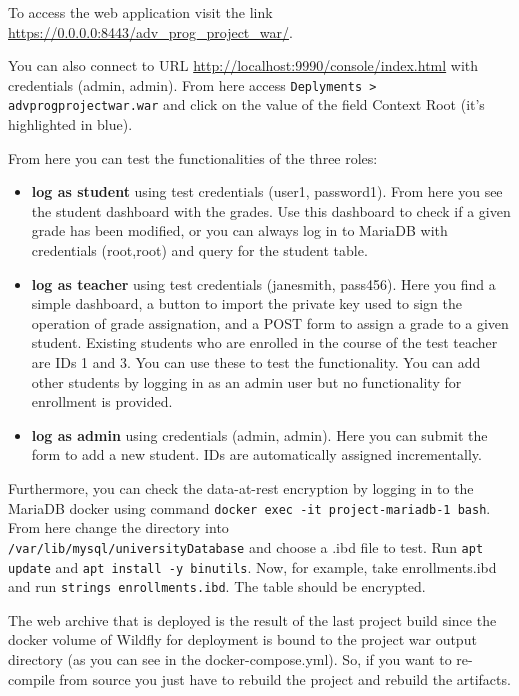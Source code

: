 To access the web application visit the link \url{https://0.0.0.0:8443/adv_prog_project_war/}.

You can also connect to URL \url{http://localhost:9990/console/index.html} with credentials (admin, admin). From here access \texttt{Deplyments > adv\textunderscore prog\textunderscore project\textunderscore war.war} and click on the value of the field Context Root (it's highlighted in blue).

From here you can test the functionalities of the three roles:

\begin{itemize}
    \item \textbf{log as student} using test credentials (user1, password1). From here you see the student dashboard with the grades. Use this dashboard to check if a given grade has been modified, or you can always log in to MariaDB with credentials (root,root) and query for the student table.
    \item \textbf{log as teacher} using test credentials (jane\textunderscore smith, pass456). Here you find a simple dashboard, a button to import the private key used to sign the operation of grade assignation, and a POST form to assign a grade to a given student. Existing students who are enrolled in the course of the test teacher are IDs 1 and 3. You can use these to test the functionality. You can add other students by logging in as an admin user but no functionality for enrollment is provided.
    \item \textbf{log as admin} using credentials (admin, admin). Here you can submit the form to add a new student. IDs are automatically assigned incrementally.
\end{itemize}

Furthermore, you can check the data-at-rest encryption by logging in to the MariaDB docker using command \texttt{docker exec -it project-mariadb-1 bash}. From here change the directory into \\\texttt{/var/lib/mysql/universityDatabase} and choose a .ibd file to test. Run \texttt{apt update} and \texttt{apt install -y binutils}. Now, for example, take enrollments.ibd and run \texttt{strings enrollments.ibd}. The table should be encrypted.

The web archive that is deployed is the result of the last project build since the docker volume of Wildfly for deployment is bound to the project war output directory (as you can see in the docker-compose.yml). So, if you want to re-compile from source you just have to rebuild the project and rebuild the artifacts.

